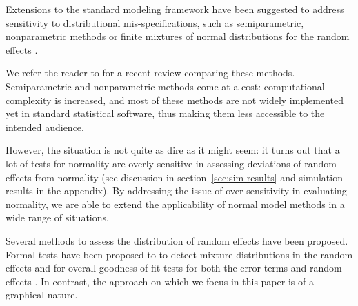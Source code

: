 \documentclass[12pt]{article} %
\newcommand{\hh}[1]{{\color{orange} #1}}
\begin{document}

Extensions to the standard modeling framework have been suggested to address sensitivity to distributional mis-specifications, such as semiparametric, nonparametric methods \citep{Shen:1999gd, Zhang:2001wo, Ghidey:2004id} or  finite mixtures of normal distributions for the random effects \citep{Verbeke:1996va}. 

We refer the reader to \cite{Ghidey:2010de} for a recent review comparing these methods. 
Semiparametric and nonparametric methods come at a cost: computational complexity is increased, and most of these methods are not widely implemented yet in standard statistical software, thus making them less accessible to the intended audience. 

However, the situation is not quite as dire as it might seem: it turns out that a lot of tests for normality are overly sensitive in assessing deviations of random effects from normality (see discussion in section~\ref{sec:sim-results} and simulation results in the appendix). By addressing the issue of over-sensitivity in evaluating normality, we are able to extend the applicability of normal model methods in a wide range of situations.




%
Several methods to assess the distribution of random effects  have been proposed. Formal tests have been proposed to to detect mixture distributions \citep{Verbeke:1996va} in the random effects and for overall goodness-of-fit tests for both the error terms and random effects \citep{Jiang:2001dx}.
In contrast, the approach on which we focus in this paper is of a graphical nature.
\end{document}
